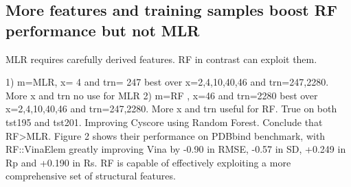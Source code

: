 \documentclass[10pt,conference,compsocconf]{IEEEtran}
\begin{document}
\subsection{More features and training samples boost RF performance but not MLR}

MLR requires carefully derived features. RF in contrast can exploit them.

1) m=MLR, x= 4 and trn= 247 best over x={2,4,10,40,46} and trn={247,2280}. More x and trn no use for MLR
2) m=RF , x=46 and trn=2280 best over x={2,4,10,40,46} and trn={247,2280}. More x and trn useful for RF.
True on both tst195 and tst201.
Improving Cyscore using Random Forest. Conclude that RF>MLR.
Figure 2 shows their performance on PDBbind benchmark, with RF::VinaElem greatly improving Vina by -0.90 in RMSE, -0.57 in SD, +0.249 in Rp and +0.190 in Rs.
RF is capable of effectively exploiting a more comprehensive set of structural features.
\end{document}
